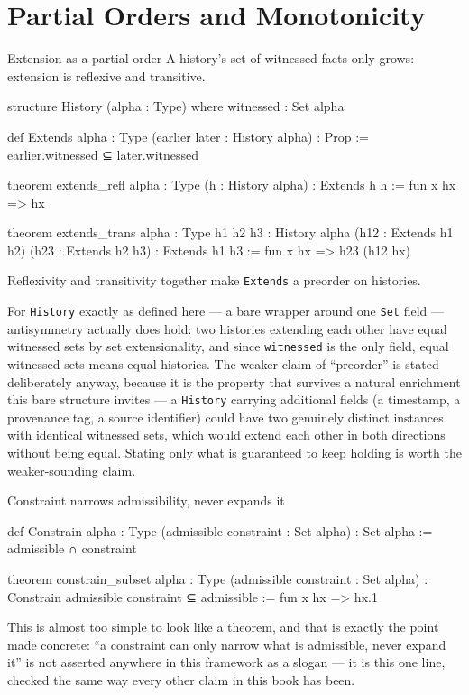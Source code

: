 \section{Partial Orders and Monotonicity}

\begin{experiment}{Extension as a partial order}
A history's set of witnessed facts only grows: extension is
reflexive and transitive.
\begin{lean}
structure History (alpha : Type) where
  witnessed : Set alpha

def Extends {alpha : Type} (earlier later : History alpha) : Prop :=
  earlier.witnessed ⊆ later.witnessed

theorem extends_refl {alpha : Type} (h : History alpha) :
    Extends h h := fun x hx => hx

theorem extends_trans {alpha : Type} {h1 h2 h3 : History alpha}
    (h12 : Extends h1 h2) (h23 : Extends h2 h3) :
    Extends h1 h3 := fun x hx => h23 (h12 hx)
\end{lean}
Reflexivity and transitivity together make \texttt{Extends} a
preorder on histories.
\end{experiment}

For \texttt{History} exactly as defined here
— a bare wrapper around one \texttt{Set} field — antisymmetry
actually does hold: two histories extending each other have equal
witnessed sets by set extensionality, and since \texttt{witnessed}
is the only field, equal witnessed sets means equal histories. The
weaker claim of ``preorder'' is stated deliberately anyway, because
it is the property that survives a natural enrichment this bare
structure invites — a \texttt{History} carrying additional fields
(a timestamp, a provenance tag, a source identifier) could have two
genuinely distinct instances with identical witnessed sets, which
would extend each other in both directions without being equal.
Stating only what is guaranteed to keep holding is worth the
weaker-sounding claim.

\begin{experiment}{Constraint narrows admissibility, never expands it}
\begin{lean}
def Constrain {alpha : Type} (admissible constraint : Set alpha) :
    Set alpha := admissible ∩ constraint

theorem constrain_subset {alpha : Type}
    (admissible constraint : Set alpha) :
    Constrain admissible constraint ⊆ admissible := fun x hx => hx.1
\end{lean}
This is almost too simple to look like a theorem, and that is
exactly the point made concrete: ``a constraint can only narrow what
is admissible, never expand it'' is not asserted anywhere in this
framework as a slogan — it is this one line, checked the same way
every other claim in this book has been.
\end{experiment}

